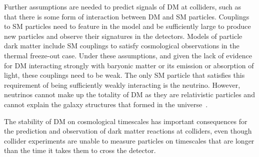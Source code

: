 Further assumptions are needed to predict signals of DM at colliders, such as that there is some form of interaction between DM and SM particles. 
Couplings to SM particles need to feature in the model and be sufficiently large to produce new particles and observe their signatures in the detectors. 
Models of particle dark matter include SM couplings to satisfy cosmological observations in the thermal freeze-out case. 
Under these assumptions, and given the lack of evidence for DM interacting strongly with baryonic matter or its emission or absorption of light, these couplings need to be weak. 
The only SM particle that satisfies this requirement of being sufficiently weakly interacting is the neutrino.
However, neutrinos cannot make up the totality of DM as they are relativistic particles and cannot explain the galaxy structures that formed in the  universe~\cite{PlehnLecturesDM}. 



The stability of DM on cosmological timescales has important consequences for the prediction and observation of dark matter reactions at colliders, even though collider experiments are unable to measure particles on timescales that are longer than the time it takes them to cross the detector. 

\begin{marginnote}[]
\end{marginnote}

